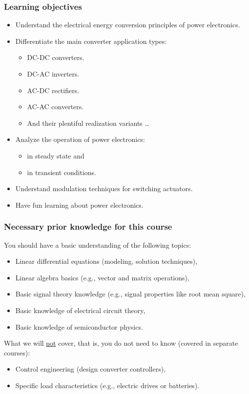 \begin{frame}
	\frametitle{Learning objectives}
	\begin{itemize}
		\item Understand the electrical energy conversion principles of power electronics.
		\item<2-> Differentiate the main converter application types:
		\begin{itemize}
			\item DC-DC converters.
			\item DC-AC inverters.
			\item AC-DC rectifiers.
			\item AC-AC converters.
			\item And their plentiful realization variants \ldots
		\end{itemize}
		\item<3-> Analyze the operation of power electronics:
		\begin{itemize}
			\item in steady state and
			\item in transient conditions.
		\end{itemize} 
		\item<4-> Understand modulation techniques for switching actuators.
		\item<5-> Have fun learning about power electronics.
	\end{itemize}
\end{frame}

\begin{frame}
	\frametitle{Necessary prior knowledge for this course}
	You should have a basic understanding of the following topics:
	\begin{itemize}
		\item Linear differential equations (modeling, solution techniques),
		\item Linear algebra basics (e.g., vector and matrix operations),
		\item Basic signal theory knowledge (e.g., signal properties like root mean square),
		\item Basic knowledge of electrical circuit theory,
		\item Basic knowledge of semiconductor physics.
	\end{itemize}
	\vspace{0.5cm}
	What we will \underline{not} cover, that is, you do not need to know (covered in separate courses):
	\begin{itemize}
		\item Control engineering (design converter controllers),
		\item Specific load characteristics (e.g., electric drives or batteries).
	\end{itemize}
\end{frame}

